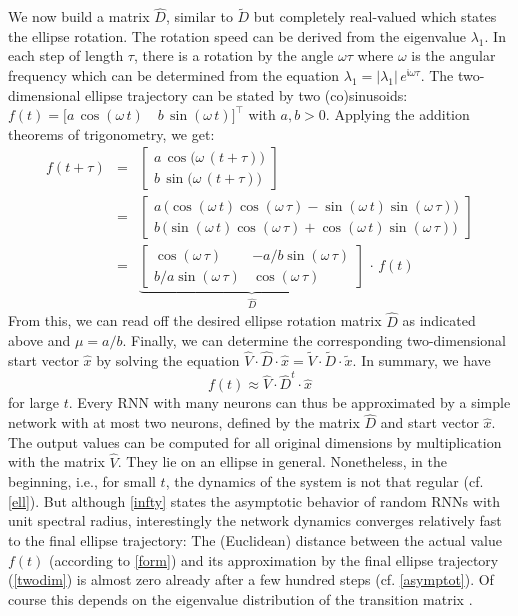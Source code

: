 \documentclass[twoside,11pt]{article}
\theoremstyle{definition}
\begin{document}
We now build a matrix $\hat{D}$, similar to $\tilde{D}$ but completely
real-valued which states the ellipse rotation. The rotation
speed can be derived from the eigenvalue $\lambda_1$. In each step of length
$\tau$, there is a rotation by the angle $\omega\tau$ where $\omega$ is the
angular frequency which can be determined from the equation $\lambda_1 =
|\lambda_1|\,e^{\mathfrak{i}\omega\tau}$. The two-dimensional ellipse trajectory can be stated by
two (co)sinusoids: $f(t) = \big[ a\,\cos(\omega\,t) \quad b\,\sin(\omega\,t)
\big]^\top$ with $a,b > 0$. Applying the addition theorems of trigonometry, we
get:
\begin{eqnarray*}
	f(t+\tau) & = &
	\left[ \begin{array}{c} a\,\cos\!\big(\omega\,(t+\tau)\big) \\ b\,\sin\!\big(\omega\,(t+\tau)\big) \end{array} \right]\\ & = &
	\left[ \begin{array}{c}
		a\,\big(\!\cos(\omega\,t) \cos(\omega\,\tau) - \sin(\omega\,t) \sin(\omega\,\tau) \big) \\
		b\,\big(\!\sin(\omega\,t) \cos(\omega\,\tau) + \cos(\omega\,t) \sin(\omega\,\tau) \big)
	\end{array} \right] \\ & = &
	\underbrace{\left[ \begin{array}{cc}
		\cos(\omega\,\tau) & -a/b \sin(\omega\,\tau) \\
		b/a \sin(\omega\,\tau) & \cos(\omega\,\tau)
	\end{array} \right]}_{\displaystyle\hat{D}}\,\cdot\,f(t)
\end{eqnarray*}
From this, we can read off the desired ellipse rotation matrix $\hat{D}$ as
indicated above and $\mu = a/b$. Finally, we can determine the corresponding
two-dimensional start vector $\hat{x}$ by solving the equation $\hat{V} \cdot
\hat{D} \cdot \hat{x} = \tilde{V} \cdot \tilde{D} \cdot \tilde{x}$.
In summary, we have
\begin{equation}\label{twodim}
	f(t) \approx \hat{V} \cdot \hat{D}^t \cdot \hat{x}
\end{equation}
for large $t$. Every RNN with many neurons can thus be
approximated by a simple network with at most two neurons, defined by the matrix
$\hat{D}$ and start vector $\hat{x}$. The output values can be computed for
all original dimensions by multiplication with the matrix $\hat{V}$. They lie on
an ellipse in general. Nonetheless, in the beginning, i.e., for small $t$, the
dynamics of the system is not that regular (cf. \cref{ell}). But although
\cref{infty} states the asymptotic behavior of random RNNs with unit spectral
radius, interestingly the network dynamics converges relatively fast to the
final ellipse trajectory: The (Euclidean) distance between the actual value
$f(t)$ (according to \cref{form}) and its approximation by the final ellipse
trajectory (\cref{twodim}) is almost zero already after a few hundred
steps (cf. \cref{asymptot}). Of course this depends on
the eigenvalue distribution of the transition matrix \citep{TV10}.
\end{document}
